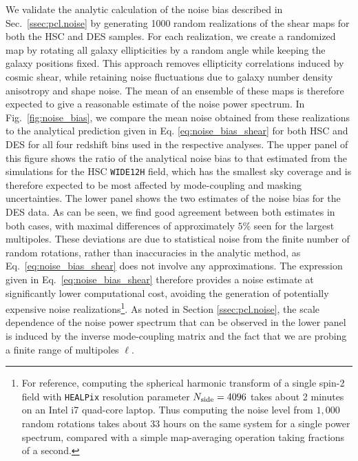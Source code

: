 \documentclass[a4paper,11pt]{article}
\begin{document}
        We validate the analytic calculation of the noise bias described in Sec.~\ref{ssec:pcl.noise} by generating 1000 random realizations of the shear maps for both the HSC and DES samples. For each realization, we create a randomized map by rotating all galaxy ellipticities by a random angle while keeping the galaxy positions fixed. This approach removes ellipticity correlations induced by cosmic shear, while retaining noise fluctuations due to galaxy number density anisotropy and shape noise. The mean of an ensemble of these maps is therefore expected to give a reasonable estimate of the noise power spectrum. In Fig.~\ref{fig:noise_bias}, we compare the mean noise obtained from these realizations to the analytical prediction given in Eq. \ref{eq:noise_bias_shear} for both HSC and DES for all four redshift bins used in the respective analyses. The upper panel of this figure shows the ratio of the analytical noise bias to that estimated from the simulations for the HSC \texttt{WIDE12H} field, which has the smallest sky coverage and is therefore expected to be most affected by mode-coupling and masking uncertainties. The lower panel shows the two estimates of the noise bias for the DES data. As can be seen, we find good agreement between both estimates in both cases, with maximal differences of approximately $5\%$ seen for the largest multipoles. These deviations are due to statistical noise from the finite number of random rotations, rather than inaccuracies in the analytic method, as Eq.~\ref{eq:noise_bias_shear} does not involve any approximations. The expression given in Eq.~\ref{eq:noise_bias_shear} therefore provides a noise estimate at significantly lower computational cost, avoiding the generation of potentially expensive noise realizations\footnote{For reference, computing the spherical harmonic transform of a single spin-2 field with \texttt{HEALPix} resolution parameter $N_{\rm side}=4096$ takes about 2 minutes on an Intel i7 quad-core laptop. Thus computing the noise level from $1{,}000$ random rotations takes about 33 hours on the same system for a single power spectrum, compared with a simple map-averaging operation taking fractions of a second.}. As noted in Section \ref{ssec:pcl.noise}, the scale dependence of the noise power spectrum that can be observed in the lower panel is induced by the inverse mode-coupling matrix and the fact that we are probing a finite range of multipoles $\ell$.
\end{document}
